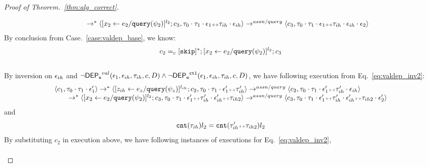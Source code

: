 \begin{proof}[Proof of Theorem.~\ref{thm:alg_correct}]
\begin{case}
\begin{subcase}
\begin{equation}
\begin{array}{l}
  \qquad \rightarrow^{*} 
  \langle [\mathrel{ {x}_2 \leftarrow e_2 / {\tt query}(\psi_2) }]^{l_2};{c}_3, 
  \mathtt{\tau}_0 \cdot \mathtt{\tau}_1 \cdot \mathtt{\epsilon}_1  {\scriptscriptstyle ++} \mathtt{\tau}_{ih} \cdot \mathtt{\epsilon}_{ih} \rangle 
  \rightarrow^{assn/query} 
  \langle {c}_3,  \mathtt{\tau}_0 \cdot \mathtt{\tau}_1 \cdot \mathtt{\epsilon}_1  {\scriptscriptstyle ++} \mathtt{\tau}_{ih} \cdot \mathtt{\epsilon}_{ih} \cdot \mathtt{\epsilon}_2 \rangle 
\end{array}
 \end{equation}
By conclusion from Case.~\ref{case:valdep_base}, we know:
\[
 c_2 =_c [\mathtt{skip}]{}^*; [\mathrel{ {x}_2 \leftarrow e_2 / {\tt query}(\psi_2) }]^{l_2};{c}_3
 \]
%
\\
By inversion on $\mathtt{\epsilon}_{ih}$ and $\neg \mathsf{DEP_{\mathtt{e}}}^{val}(\mathtt{\epsilon}_1, \mathtt{\epsilon}_{ih}, \mathtt{\tau}_{ih}, c, D) \land  \neg\mathsf{DEP_{\mathtt{e}}}^{\mathtt{{ctl}}}(\mathtt{\epsilon}_1, \mathtt{\epsilon}_{ih}, \mathtt{\tau}_{ih}, c, D) $,
we have following execution from Eq.~\ref{eq:valdep_inv2}:
\begin{equation}
\label{eq:m1asn_inv2}
  \begin{array}{l}   
  \langle c_1, \mathtt{\tau}_0 \cdot \mathtt{\tau}_1 \cdot \mathtt{\epsilon}_1' \rangle 
  \rightarrow^{*} 
  \langle [\mathrel{ z_{ih} \leftarrow e_z / {\tt query}(\psi_z) }]^{l_{ih}};{c}_2, 
  \mathtt{\tau}_0 \cdot \mathtt{\tau}_1 \cdot \mathtt{\epsilon}_1' {\scriptscriptstyle ++} \mathtt{\tau}_{ih}' \rangle 
  \rightarrow^{assn/query} 
  \langle {c}_2,  \mathtt{\tau}_0 \cdot \mathtt{\tau}_1 \cdot \mathtt{\epsilon}_1'  {\scriptscriptstyle ++} \mathtt{\tau}_{ih}' \cdot \mathtt{\epsilon}_{ih} \rangle  \\
  \qquad \rightarrow^{*} 
  \langle [\mathrel{ {x}_2 \leftarrow e_2 / {\tt query}(\psi_2) }]^{l_2};{c}_3, 
  \mathtt{\tau}_0 \cdot \mathtt{\tau}_1 \cdot \mathtt{\epsilon}_1'  {\scriptscriptstyle ++} \mathtt{\tau}_{ih}' \cdot \mathtt{\epsilon}_{ih}' {\scriptscriptstyle ++} \mathtt{\tau}_{ih2} \rangle 
  \rightarrow^{assn/query} 
  \langle {c}_3,  \mathtt{\tau}_0 \cdot \mathtt{\tau}_1 \cdot \mathtt{\epsilon}_1'  {\scriptscriptstyle ++} \mathtt{\tau}_{ih}' \cdot \mathtt{\epsilon}_{ih}' {\scriptscriptstyle ++} \mathtt{\tau}_{ih2} \cdot \mathtt{\epsilon}_2' \rangle 
\end{array}
 \end{equation}
and
 \[
 \mathtt{cnt}(\mathtt{\tau}_{ih}) l_2 = \mathtt{cnt}(\mathtt{\tau}_{ih}'{\scriptscriptstyle ++} \mathtt{\tau}_{ih2}) l_2
 \]
By substituting $c_2$  in execution above, 
we have following instances of executions for Eq.~\ref{eq:valdep_inv2}, 
%
\begin{equation}
\label{eq:m1asn_inv2}
  \begin{array}{l}   

\end{array}
\end{equation}
\end{subcase}
\end{case}
\end{proof}

